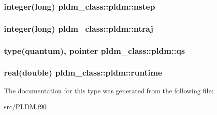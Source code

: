 \hypertarget{structpldm__class_1_1pldm_a4cf2258a15663bb09c8deaacc46f8feb}{
\subsubsection[{nstep}]{\setlength{\rightskip}{0pt plus 5cm}integer(long) pldm\-\_\-class\-::pldm\-::nstep\hspace{0.3cm}{\ttfamily [private]}}}\label{structpldm__class_1_1pldm_a4cf2258a15663bb09c8deaacc46f8feb}
\hypertarget{structpldm__class_1_1pldm_aab5aaef447d621035a2492d5c64aa965}{
\subsubsection[{ntraj}]{\setlength{\rightskip}{0pt plus 5cm}integer(long) pldm\-\_\-class\-::pldm\-::ntraj\hspace{0.3cm}{\ttfamily [private]}}}\label{structpldm__class_1_1pldm_aab5aaef447d621035a2492d5c64aa965}
\hypertarget{structpldm__class_1_1pldm_a928fc31d7c422b903cf8be2c66ecc8ab}{
\subsubsection[{qs}]{\setlength{\rightskip}{0pt plus 5cm}type(quantum), pointer pldm\-\_\-class\-::pldm\-::qs\hspace{0.3cm}{\ttfamily [private]}}}\label{structpldm__class_1_1pldm_a928fc31d7c422b903cf8be2c66ecc8ab}
\hypertarget{structpldm__class_1_1pldm_a6792078530b667f6e179e339ad3f705b}{
\subsubsection[{runtime}]{\setlength{\rightskip}{0pt plus 5cm}real(double) pldm\-\_\-class\-::pldm\-::runtime\hspace{0.3cm}{\ttfamily [private]}}}\label{structpldm__class_1_1pldm_a6792078530b667f6e179e339ad3f705b}


The documentation for this type was generated from the following file\-:\begin{DoxyCompactItemize}
\item 
src/\hyperlink{_p_l_d_m_8f90}{P\-L\-D\-M.\-f90}\end{DoxyCompactItemize}
